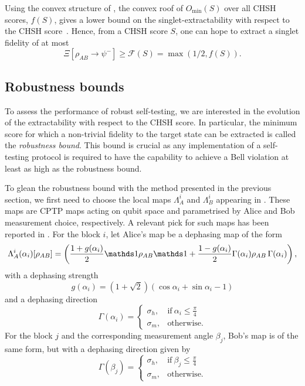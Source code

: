 Using the convex structure of , the convex roof of $O_{\min}(S)$ over all CHSH scores, $f(S)$, gives a lower bound on the singlet-extractability with respect to the CHSH score~\cite{Sekatski2018}.
Hence, from a CHSH score $S$, one can hope to extract a singlet fidelity of at most 
\begin{equation}
	\Xi [\rho_{AB} \rightarrow \psi^{-}] \geq \mathcal{F}(S)=\max\left(1/2, f(S)\right).
\end{equation}

\subsection{Robustness bounds}

To assess the performance of robust self-testing, we are interested in the evolution of the extractability with respect to the CHSH score.
In particular, the minimum score for which a non-trivial fidelity to the target state can be extracted is called the \textit{robustness bound}.
This bound is crucial as any implementation of a self-testing protocol is required to have the capability to achieve a Bell violation at least as high as the robustness bound.

To glean the robustness bound with the method presented in the previous section, we first need to choose the local maps $\Lambda_A^i$ and $\Lambda_B^i$ appearing in .
These maps are \acrlong{CPTP} maps acting on qubit space and parametrised by Alice and Bob measurement choice, respectively.
A relevant pick for such maps has been reported in \cite{Kaniewski2016}.
For the block $i$, let Alice's map be a dephasing map of the form
\begin{equation}
	\Lambda_A^i(\alpha_i)[\rho_{AB}] = \left( \frac{1+g(\alpha_i)}{2}\id\rho_{AB}\id+\frac{1-g(\alpha_i)}{2}\Gamma(\alpha_i)\rho_{AB}\,\Gamma(\alpha_i)\right),
	\label{eq:dephasing_maps}
\end{equation}
with a dephasing strength
\begin{equation}
	g(\alpha_i)=(1+\sqrt{2})(\cos{\alpha_i}+\sin{\alpha_i}-1)
	\label{eq:dephasing_strength}
\end{equation}
and a dephasing direction
\begin{equation}
	\Gamma(\alpha_i) = \begin{cases}
      \sigma_h, & \text{if}\ \alpha_i\leq\frac{\pi}{4} \\
      \sigma_m, & \text{otherwise}.
    \end{cases}
	\label{eq:dephasing_direction_alice}
\end{equation}
For the block $j$ and the corresponding measurement angle $\beta_j$, Bob's map is of the same form, but with a dephasing direction given by
\begin{equation}
	\Gamma(\beta_j) = \begin{cases}
      \sigma_h, & \text{if}\ \beta_j\leq\frac{\pi}{4} \\
      \sigma_m, & \text{otherwise}.
    \end{cases}
	\label{eq:dephasing_direction_bob}
\end{equation}

